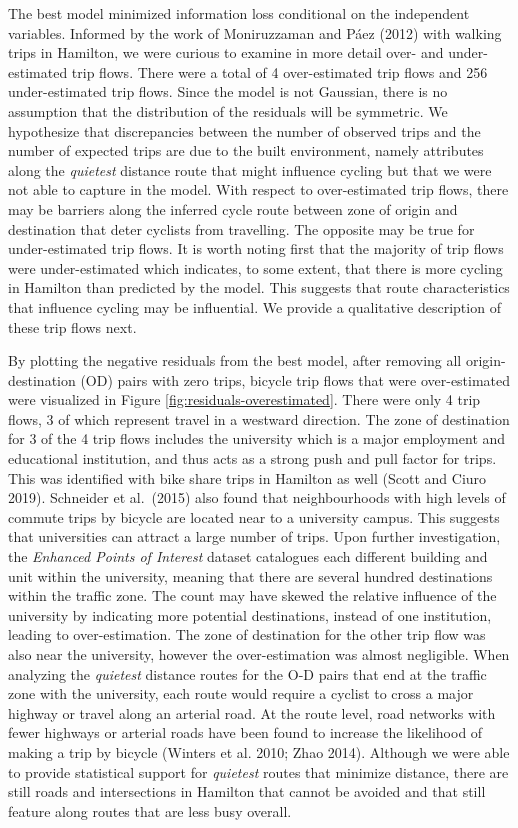 \documentclass[smallextended]{svjour3}       %
\begin{document}
The best model minimized information loss conditional on the independent
variables. Informed by the work of Moniruzzaman and Páez (2012) with
walking trips in Hamilton, we were curious to examine in more detail
over- and under-estimated trip flows. There were a total of 4
over-estimated trip flows and 256 under-estimated trip flows. Since the
model is not Gaussian, there is no assumption that the distribution of
the residuals will be symmetric. We hypothesize that discrepancies
between the number of observed trips and the number of expected trips
are due to the built environment, namely attributes along the
\emph{quietest} distance route that might influence cycling but that we
were not able to capture in the model. With respect to over-estimated
trip flows, there may be barriers along the inferred cycle route between
zone of origin and destination that deter cyclists from travelling. The
opposite may be true for under-estimated trip flows. It is worth noting
first that the majority of trip flows were under-estimated which
indicates, to some extent, that there is more cycling in Hamilton than
predicted by the model. This suggests that route characteristics that
influence cycling may be influential. We provide a qualitative
description of these trip flows next.

By plotting the negative residuals from the best model, after removing
all origin-destination (OD) pairs with zero trips, bicycle trip flows
that were over-estimated were visualized in Figure
\ref{fig:residuals-overestimated}. There were only 4 trip flows, 3 of
which represent travel in a westward direction. The zone of destination
for 3 of the 4 trip flows includes the university which is a major
employment and educational institution, and thus acts as a strong push
and pull factor for trips. This was identified with bike share trips in
Hamilton as well (Scott and Ciuro 2019). Schneider et al.~(2015) also
found that neighbourhoods with high levels of commute trips by bicycle
are located near to a university campus. This suggests that universities
can attract a large number of trips. Upon further investigation, the
\emph{Enhanced Points of Interest} dataset catalogues each different
building and unit within the university, meaning that there are several
hundred destinations within the traffic zone. The count may have skewed
the relative influence of the university by indicating more potential
destinations, instead of one institution, leading to over-estimation.
The zone of destination for the other trip flow was also near the
university, however the over-estimation was almost negligible. When
analyzing the \emph{quietest} distance routes for the O-D pairs that end
at the traffic zone with the university, each route would require a
cyclist to cross a major highway or travel along an arterial road. At
the route level, road networks with fewer highways or arterial roads
have been found to increase the likelihood of making a trip by bicycle
(Winters et al. 2010; Zhao 2014). Although we were able to provide
statistical support for \emph{quietest} routes that minimize distance,
there are still roads and intersections in Hamilton that cannot be
avoided and that still feature along routes that are less busy overall.
\end{document}
